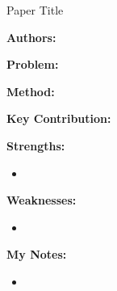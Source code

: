 \begin{paper}{Paper Title}

\textbf{Authors:}  

\textbf{Problem:}  

\textbf{Method:}  

\textbf{Key Contribution:}

\textbf{Strengths:}
\begin{itemize}
    \item 
\end{itemize}

\textbf{Weaknesses:}
\begin{itemize}
    \item 
\end{itemize}

\textbf{My Notes:}
\begin{itemize}
    \item 
\end{itemize}

\end{paper}